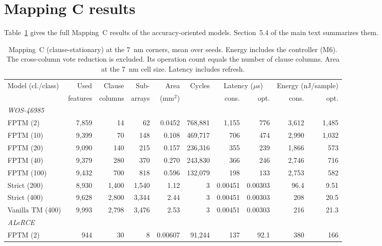 \documentclass[preprint,12pt]{elsarticle}
\newcommand{\hyp}[1]{#1}
\begin{document}
\section{Mapping C results}\label{mapCres}
Table~\ref{tab:mapC} gives the full Mapping~C results of the accuracy-oriented models. Section~5.4 of the main text summarizes them.

\begin{table}
\footnotesize
\setlength{\tabcolsep}{4pt}
\centering
\caption{Mapping~C (clause-stationary) at the 7~nm corners, mean over seeds. Energy includes the controller (M6). The cross-column vote reduction is excluded. Its operation count equals the number of clause columns. Area at the 7~nm cell size. Latency includes refresh.}
\label{tab:mapC}
\begin{tabular}{lrrrrrrrrr}
\toprule
\multirow{2}{*}{Model (cl./class)} & Used & Clause & Sub- & Area & Cycles & \multicolumn{2}{c}{Latency ($\mu$s)} & \multicolumn{2}{c}{Energy (nJ/sample)} \\
 & features & columns & arrays & (mm$^2$) & & cons. & opt. & cons. & opt. \\
\midrule
\multicolumn{10}{l}{\textit{WOS-46985}} \\
FPTM (2) & 7,859 & 14 & 62 & \hyp{0.0452} & 768,881 & \hyp{1,155} & \hyp{776} & \hyp{3,612} & \hyp{1,485} \\
FPTM (10) & 9,399 & 70 & 148 & \hyp{0.108} & 469,717 & \hyp{706} & \hyp{474} & \hyp{2,990} & \hyp{1,032} \\
FPTM (20) & 9,090 & 140 & 215 & \hyp{0.157} & 236,316 & \hyp{355} & \hyp{239} & \hyp{1,866} & \hyp{573} \\
FPTM (40) & 9,379 & 280 & 370 & \hyp{0.270} & 243,830 & \hyp{366} & \hyp{246} & \hyp{2,746} & \hyp{716} \\
FPTM (100) & 9,432 & 700 & 818 & \hyp{0.596} & 132,079 & \hyp{198} & \hyp{133} & \hyp{2,753} & \hyp{582} \\
Strict (200) & 8,930 & 1,400 & 1,540 & \hyp{1.12} & 3 & \hyp{0.00451} & \hyp{0.00303} & \hyp{96.4} & \hyp{9.51} \\
Strict (400) & 9,628 & 2,800 & 3,344 & \hyp{2.44} & 3 & \hyp{0.00451} & \hyp{0.00303} & \hyp{208} & \hyp{20.5} \\
Vanilla TM (400) & 9,993 & 2,798 & 3,476 & \hyp{2.53} & 3 & \hyp{0.00451} & \hyp{0.00303} & \hyp{216} & \hyp{21.3} \\
\midrule
\multicolumn{10}{l}{\textit{ALeRCE}} \\
FPTM (2) & 944 & 30 & 8 & \hyp{0.00607} & 91,244 & \hyp{137} & \hyp{92.1} & \hyp{380} & \hyp{166} \\

\end{tabular}
\end{table}
\end{document}
